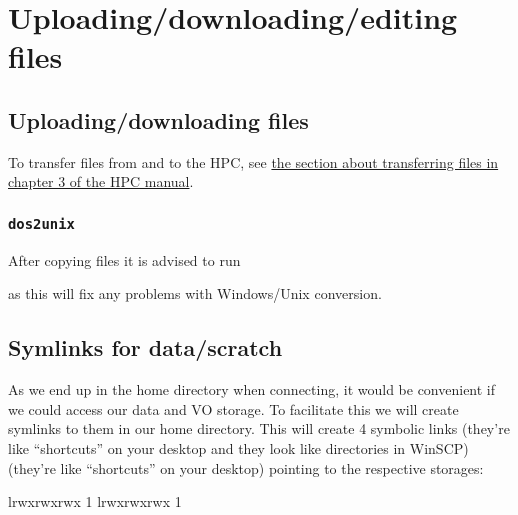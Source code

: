 \chapter{Uploading/downloading/editing files}

\section{Uploading/downloading files}
\label{sec:uploading-files}

To transfer files from and to the HPC, see
\href{\HPCManualURL#sec:filetranfer}{the section about transferring files in chapter 3 of the HPC manual}.

\ifwindows

\subsection{\texttt{dos2unix}}
\label{subsec:dos2unix}
\hypertarget{sec:dos2unix}{}
After copying files it is advised to run

\begin{prompt}
\end{prompt}

as this will fix any problems with Windows/Unix conversion.
\fi

\section{Symlinks for data/scratch}
\label{sec:symlink-for-data}
\hypertarget{sec:symlink-for-data}{}

As we end up in the home directory when connecting, it would be convenient if we
could access our data and VO storage. To facilitate this we will create
symlinks to them in our home directory. This will create 4 symbolic links
\ifwindows
(they're like ``shortcuts'' on your desktop and they look like directories in WinSCP)
\else
(they're like ``shortcuts'' on your desktop)
\fi
pointing to the respective storages:

\begin{prompt}
lrwxrwxrwx 1 %
lrwxrwxrwx 1 %
\end{prompt}

